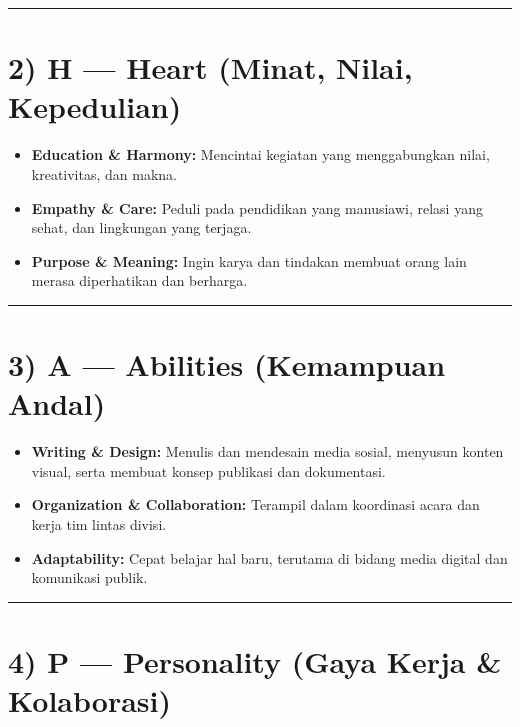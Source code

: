 \documentclass[
  letterpaper,
  DIV=11,
  numbers=noendperiod]{scrreprt}
\providecommand{\tightlist}{%
  \setlength{\itemsep}{0pt}\setlength{\parskip}{0pt}}
\begin{document}
\begin{center}\rule{0.5\linewidth}{0.5pt}\end{center}

\section{2) H --- Heart (Minat, Nilai,
Kepedulian)}\label{h-heart-minat-nilai-kepedulian}

\begin{itemize}
\tightlist
\item
  \textbf{Education \& Harmony:} Mencintai kegiatan yang menggabungkan
  nilai, kreativitas, dan makna.
\item
  \textbf{Empathy \& Care:} Peduli pada pendidikan yang manusiawi,
  relasi yang sehat, dan lingkungan yang terjaga.
\item
  \textbf{Purpose \& Meaning:} Ingin karya dan tindakan membuat orang
  lain merasa diperhatikan dan berharga.
\end{itemize}

\begin{center}\rule{0.5\linewidth}{0.5pt}\end{center}

\section{3) A --- Abilities (Kemampuan
Andal)}\label{a-abilities-kemampuan-andal}

\begin{itemize}
\tightlist
\item
  \textbf{Writing \& Design:} Menulis dan mendesain media sosial,
  menyusun konten visual, serta membuat konsep publikasi dan
  dokumentasi.
\item
  \textbf{Organization \& Collaboration:} Terampil dalam koordinasi
  acara dan kerja tim lintas divisi.
\item
  \textbf{Adaptability:} Cepat belajar hal baru, terutama di bidang
  media digital dan komunikasi publik.
\end{itemize}

\begin{center}\rule{0.5\linewidth}{0.5pt}\end{center}

\section{4) P --- Personality (Gaya Kerja \&
Kolaborasi)}\label{p-personality-gaya-kerja-kolaborasi}
\end{document}
